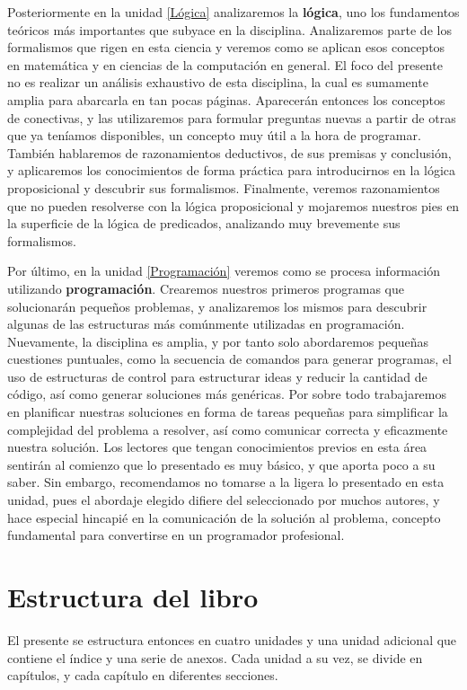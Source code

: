 Posteriormente en la unidad \ref{Lógica} analizaremos la \textbf{lógica}, uno los
fundamentos teóricos más importantes que subyace en la disciplina. Analizaremos
parte de los formalismos que rigen en esta ciencia y veremos como se aplican
esos conceptos en matemática y en ciencias de la computación en general. El foco
del presente no es realizar un análisis exhaustivo de esta disciplina, la cual
es sumamente amplia para abarcarla en tan pocas páginas. Aparecerán entonces
los conceptos de conectivas, y las utilizaremos para formular preguntas nuevas a
partir de otras que ya teníamos disponibles, un concepto muy útil a la hora
de programar. También hablaremos de razonamientos deductivos, de sus premisas y
conclusión, y aplicaremos los conocimientos de forma práctica para introducirnos
en la lógica proposicional y descubrir sus formalismos. Finalmente, veremos
razonamientos que no pueden resolverse con la lógica proposicional y mojaremos
nuestros pies en la superficie de la lógica de predicados, analizando muy brevemente
sus formalismos.

Por último, en la unidad \ref{Programación} veremos como se procesa información utilizando
\textbf{programación}. Crearemos nuestros primeros programas que solucionarán
pequeños problemas, y analizaremos los mismos para descubrir algunas de las
estructuras más comúnmente utilizadas en programación. Nuevamente, la disciplina
es amplia, y por tanto solo abordaremos pequeñas cuestiones puntuales, como la
secuencia de comandos para generar programas, el uso de estructuras de control
para estructurar ideas y reducir la cantidad de código, así como generar
soluciones más genéricas. Por sobre todo trabajaremos en planificar nuestras
soluciones en forma de tareas pequeñas para simplificar la complejidad del
problema a resolver, así como comunicar correcta y eficazmente nuestra solución.
Los lectores que tengan conocimientos previos en esta área sentirán al comienzo
que lo presentado es muy básico, y que aporta poco a su saber. Sin embargo,
recomendamos no tomarse a la ligera lo presentado en esta unidad, pues el
abordaje elegido difiere del seleccionado por muchos autores, y hace especial
hincapié en la comunicación de la solución al problema, concepto fundamental
para convertirse en un programador profesional.

\section*{Estructura del libro}

El presente se estructura entonces en cuatro unidades y una unidad adicional
que contiene el índice y una serie de anexos. Cada unidad a su vez, se
divide en capítulos, y cada capítulo en diferentes secciones.


